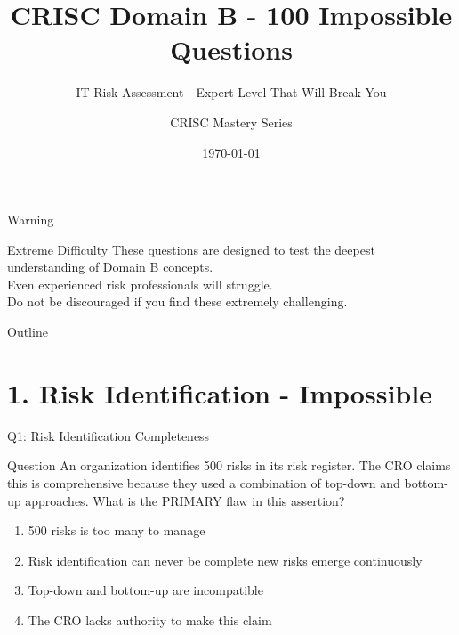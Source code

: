 \documentclass{beamer}
\title{CRISC Domain B - 100 Impossible Questions}
\subtitle{IT Risk Assessment - Expert Level That Will Break You}
\author{CRISC Mastery Series}
\date{\today}
\begin{document}
	
	\begin{frame}
		\titlepage
	\end{frame}
	
	\begin{frame}{Warning}
		\begin{alertblock}{Extreme Difficulty}
			These questions are designed to test the deepest understanding of Domain B concepts.\\
			Even experienced risk professionals will struggle.\\
			Do not be discouraged if you find these extremely challenging.
		\end{alertblock}
	\end{frame}
	
	\begin{frame}{Outline}
		\tableofcontents
	\end{frame}
	
	
	\section{1. Risk Identification - Impossible}
	
	\begin{frame}{Q1: Risk Identification Completeness}
		\begin{block}{Question}
			An organization identifies 500 risks in its risk register. The CRO claims this is comprehensive because they used a combination of top-down and bottom-up approaches. What is the PRIMARY flaw in this assertion?
		\end{block}
		\begin{enumerate} 
			\item 500 risks is too many to manage
			\item Risk identification can never be complete  new risks emerge continuously
			\item Top-down and bottom-up are incompatible
			\item The CRO lacks authority to make this claim
		\end{enumerate}
	\end{frame}
	
\end{document}
